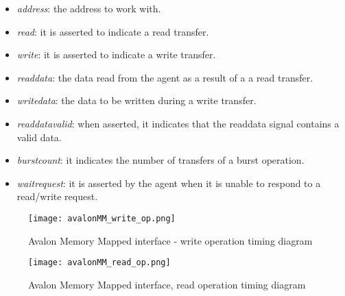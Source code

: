 \documentclass[10pt, english, a4paper, titlepage, oneside]{book}
\begin{document}
\begin{itemize}
    \item \textit{address}: the address to work with.
    \vspace{1mm}
    \item \textit{read}: it is asserted to indicate a read transfer.
    \vspace{1mm}
    \item \textit{write}: it is asserted to indicate a write transfer.
    \vspace{1mm}
    \item \textit{readdata}: the data read from the agent as a result of a a read transfer.
    \vspace{1mm}
    \item \textit{writedata}: the data to be written during a write transfer.
    \vspace{1mm}
    \item \textit{readdatavalid}: when asserted, it indicates that the readdata signal contains a valid data.
    \vspace{1mm}
    \item \textit{burstcount}: it indicates the number of transfers of a burst operation.
    \vspace{1mm}
    \item \textit{waitrequest}: it is asserted by the agent when it is unable to respond to a read/write request.
\end{itemize} 
\vspace{6mm}
\begin{figure}[H]
    \centering
    \texttt{[image: avalonMM\_write\_op.png]}
    \vspace{5mm}
    \caption{Avalon Memory Mapped interface - write operation timing diagram}
    \label{avalonMM_write_op}
\end{figure}
\vspace{6mm}
\begin{figure}[H]
    \centering
    \texttt{[image: avalonMM\_read\_op.png]}
    \vspace{5mm}
    \caption{Avalon Memory Mapped interface, read operation timing diagram}
    \label{avalonMM_read_op}
\end{figure}
\vspace{6mm}
\end{document}
